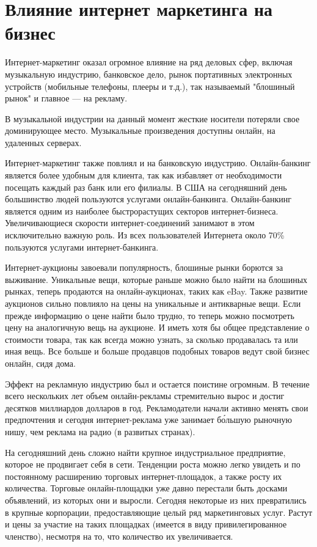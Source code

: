 \documentclass[a4paper,english,russian]{G2-105}
\begin{document}
\section{Влияние интернет маркетинга на бизнес}
\par Интернет-маркетинг оказал огромное влияние на ряд деловых сфер, включая музыкальную индустрию, банковское дело, рынок портативных электронных устройств (мобильные телефоны, плееры и т.д.), так называемый "блошиный рынок" и главное --- на рекламу.
\par В музыкальной индустрии на данный момент жесткие носители потеряли свое доминирующее место. Музыкальные произведения доступны онлайн, на удаленных серверах.
\par Интернет-маркетинг также повлиял и на банковскую индустрию. Онлайн-банкинг является более удобным для клиента, так как избавляет от необходимости посещать каждый раз банк или его филиалы. В США на сегодняшний день большинство людей пользуются услугами онлайн-банкинга. Онлайн-банкинг является одним из наиболее быстрорастущих секторов интернет-бизнеса. Увеличивающиеся скорости интернет-соединений занимают в этом исключительно важную роль. Из всех пользователей Интернета около 70\% пользуются услугами интернет-банкинга.
\par Интернет-аукционы завоевали популярность, блошиные рынки борются за выживание. Уникальные вещи, которые раньше можно было найти на блошиных рынках, теперь продаются на онлайн-аукционах, таких как eBay. Также развитие аукционов сильно повлияло на цены на уникальные и антикварные вещи. Если прежде информацию о цене найти было трудно, то теперь можно посмотреть цену на аналогичную вещь на аукционе. И иметь хотя бы общее представление о стоимости товара, так как всегда можно узнать, за сколько продавалась та или иная вещь. Все больше и больше продавцов подобных товаров ведут свой бизнес онлайн, сидя дома.
\par Эффект на рекламную индустрию был и остается поистине огромным. В течение всего нескольких лет объем онлайн-рекламы стремительно вырос и достиг десятков миллиардов долларов в год. Рекламодатели начали активно менять свои предпочтения и сегодня интернет-реклама уже занимает бо́льшую рыночную нишу, чем реклама на радио (в развитых странах).
\par На сегодняшний день сложно найти крупное индустриальное предприятие, которое не продвигает себя в сети. Тенденции роста можно легко увидеть и по постоянному расширению торговых интернет-площадок, а также росту их количества. Торговые онлайн-площадки уже давно перестали быть досками объявлений, из которых они и выросли. Сегодня некоторые из них превратились в крупные корпорации, предоставляющие целый ряд маркетинговых услуг. Растут и цены за участие на таких площадках (имеется в виду привилегированное членство), несмотря на то, что количество их увеличивается.
\end{document}
